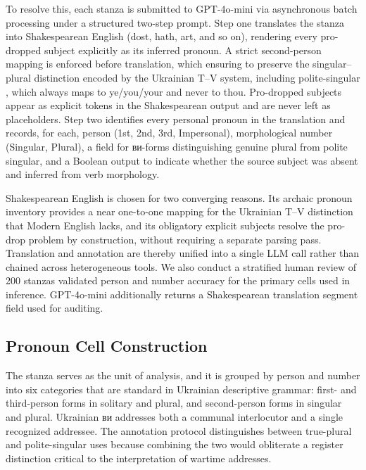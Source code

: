 \documentclass[12pt]{interact}
\theoremstyle{plain}%
\theoremstyle{definition}
\theoremstyle{remark}
\begin{document}
To resolve this, each stanza is submitted to GPT-4o-mini via asynchronous batch processing under a structured two-step prompt. Step one translates the stanza into Shakespearean English (dost, hath, art, and so on), rendering every pro-dropped subject explicitly as its inferred pronoun. A strict second-person mapping is enforced before translation, which ensuring to preserve the singular–plural distinction encoded by the Ukrainian T–V system, including polite-singular {}, which always maps to ye/you/your and never to thou. Pro-dropped subjects appear as explicit tokens in the Shakespearean output and are never left as placeholders. Step two identifies every personal pronoun in the translation and records, for each, person (1st, 2nd, 3rd, Impersonal), morphological number (Singular, Plural), a field for {\ukrainianfont ви}-forms distinguishing genuine plural from polite singular, and a Boolean output to indicate whether the source subject was absent and inferred from verb morphology.

Shakespearean English is chosen for two converging reasons. Its archaic pronoun inventory provides a near one-to-one mapping for the Ukrainian T–V distinction that Modern English lacks, and its obligatory explicit subjects resolve the pro-drop problem by construction, without requiring a separate parsing pass. Translation and annotation are thereby unified into a single LLM call rather than chained across heterogeneous tools. We also conduct a stratified human review of 200 stanzas validated person and number accuracy for the primary cells used in inference. GPT-4o-mini additionally returns a Shakespearean translation segment field used for auditing.

\subsection{Pronoun Cell Construction}

The stanza serves as the unit of analysis, and it is grouped by person and number into six categories that are standard in Ukrainian descriptive grammar: first- and third-person forms in solitary and plural, and second-person forms in singular and plural. Ukrainian {\ukrainianfont ви} addresses both a communal interlocutor and a single recognized addressee. The annotation protocol distinguishes between true-plural and polite-singular uses because combining the two would obliterate a register distinction critical to the interpretation of wartime addresses.
\end{document}
